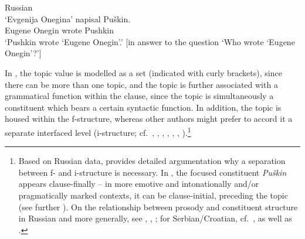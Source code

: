 \documentclass[output=paper,hidelinks]{langscibook}
\begin{document}
\ea  Russian %
    \label{ex:Slavic:8}\\
    \gll `Evgenija   Onegina'   napisal   Puškin.\\
        Eugene   Onegin   wrote     Pushkin\\
    \glt `Pushkin wrote `Eugene Onegin'.' [in answer to the question
      `Who wrote `Eugene Onegin'?']
    \z



In , the topic value is modelled as a set (indicated with curly brackets), since there can be more than one topic, and the topic is further associated with a grammatical function within the clause, since the topic is simultaneously a constituent which bears a certain syntactic function. In addition, the topic is housed within the f-structure, whereas other authors might prefer to accord it a separate interfaced level (i-structure; cf.\ \citealt[216--218, 250--251]{King95}, \citealt{King1997}, \citealt[182--183]{dalrymple01}, \citealt[22]{Patejuk2015}, \citealt[98--99, 106]{BresnanEtAl2016}, \citealt[121ff., 366--367, 374--394]{DLM:LFG}, ).\footnote{Based on Russian data, \citet{King1997} provides detailed argumentation why a separation between f- and i-structure is necessary. In , the focused constituent \textit{Puškin} appears clause-finally -- in more emotive and intonationally and/or pragmatically marked contexts, it can be clause-initial, preceding the topic (see further \citealt[91--92, 153, 207ff.]{King95}). On the relationship between prosody and constituent structure in Russian and more generally, see \citet[128ff.]{King95}, \citet[50]{dalrymple01}, \citet[94--95, 400ff.]{DLM:LFG}; for Serbian/Croatian, cf.\ \citet{Connor2006}, as well as .} 
\end{document}
